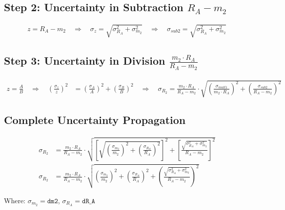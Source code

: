 \documentclass{article} %
\begin{document}
\subsection*{Step 2: Uncertainty in Subtraction $R_A - m_2$}
\begin{align*}
z = R_A - m_2 \quad \Rightarrow \quad \sigma_z = \sqrt{\sigma_{R_A}^2 + \sigma_{m_2}^2} \quad \Rightarrow \quad \sigma_{sub2} = \sqrt{\sigma_{R_A}^2 + \sigma_{m_2}^2}
\end{align*}

\subsection*{Step 3: Uncertainty in Division $\frac{m_2 \cdot R_A}{R_A - m_2}$}
\begin{align*}
z = \frac{A}{B} \quad \Rightarrow \quad \left(\frac{\sigma_z}{z}\right)^2 &= \left(\frac{\sigma_A}{A}\right)^2 + \left(\frac{\sigma_B}{B}\right)^2 \quad \Rightarrow \quad \sigma_{R_2} = \frac{m_2 \cdot R_A}{R_A - m_2} \cdot \sqrt{\left(\frac{\sigma_{mult1}}{m_2 \cdot R_A}\right)^2 + \left(\frac{\sigma_{sub2}}{R_A - m_2}\right)^2}
\end{align*}

\subsection*{Complete Uncertainty Propagation}
\begin{align*}
\sigma_{R_2} &= \frac{m_2 \cdot R_A}{R_A - m_2} \cdot \sqrt{\left[\sqrt{\left(\frac{\sigma_{m_2}}{m_2}\right)^2 + \left(\frac{\sigma_{R_A}}{R_A}\right)^2}\right]^2 + \left[\frac{\sqrt{\sigma_{R_A}^2 + \sigma_{m_2}^2}}{R_A - m_2}\right]^2} \\
\sigma_{R_2} &= \frac{m_2 \cdot R_A}{R_A - m_2} \cdot \sqrt{\left(\frac{\sigma_{m_2}}{m_2}\right)^2 + \left(\frac{\sigma_{R_A}}{R_A}\right)^2 + \left(\frac{\sqrt{\sigma_{R_A}^2 + \sigma_{m_2}^2}}{R_A - m_2}\right)^2}
\end{align*}

Where: $\sigma_{m_2} = \texttt{dm2}$, $\sigma_{R_A} = \texttt{dR\_A}$
\end{document}
